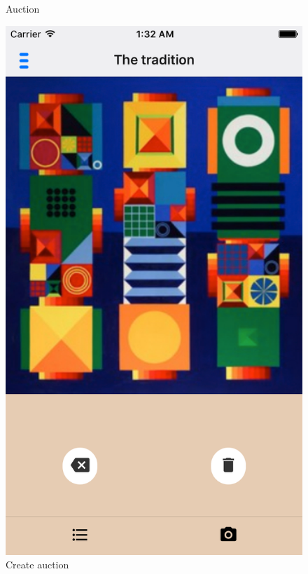 \begin{figure}[H]
\centering
  \begin{minipage}[b]{0.285\linewidth}
    \caption{Auction}
    \includegraphics[width=\linewidth]{Appendix/VerticalPrototype/auction.png}
  \end{minipage}
  \hspace{0.6cm}
  \begin{minipage}[b]{0.285\linewidth}
    \caption{\newline Create auction}

\end{minipage}
\end{figure}
